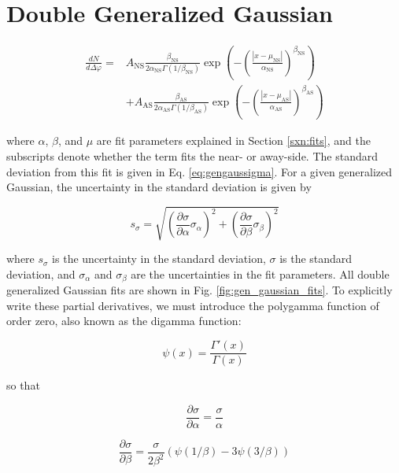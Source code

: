 \documentclass[../main.tex]{subfiles}
\begin{document}
\clearpage
\section{Double Generalized Gaussian}

\begin{align}
     \frac{dN}{d\Delta\varphi} =& A_{\text{NS}}\frac{\beta_{\text{NS}}}{2\alpha_{\text{NS}}\Gamma(1/\beta_{\text{NS}})}\exp{\left(-\left(\frac{|x-\mu_{\text{NS}}|}{\alpha_\text{NS}}\right)^{\beta_{\text{NS}}}\right)} \\
     &+ A_{\text{AS}}\frac{\beta_{\text{AS}}}{2\alpha_{\text{AS}}\Gamma(1/\beta_{\text{AS}})}\exp{\left(-\left(\frac{|x-\mu_{\text{AS}}|}{\alpha_\text{AS}}\right)^{\beta_{\text{AS}}}\right)}
\end{align}

where $\alpha$, $\beta$, and $\mu$ are fit parameters explained in Section \ref{sxn:fits}, and the subscripts denote whether the term fits the near- or away-side. The standard deviation from this fit is given in Eq. \ref{eq:gengaussigma}. For a given generalized Gaussian, the uncertainty in the standard deviation is given by

\begin{equation}
    s_{\sigma} = \sqrt{\left(\frac{\partial \sigma}{\partial \alpha} \sigma_\alpha\right)^2 + \left(\frac{\partial \sigma}{\partial \beta} \sigma_\beta\right)^2}
\end{equation}

where $s_\sigma$ is the uncertainty in the standard deviation, $\sigma$ is the standard deviation, and $\sigma_\alpha$ and $\sigma_\beta$ are the uncertainties in the fit parameters. All double generalized Gaussian fits are shown in Fig. \ref{fig:gen_gaussian_fits}. To explicitly write these partial derivatives, we must introduce the polygamma function of order zero, also known as the digamma function:

\begin{equation}
    \psi(x) = \frac{\Gamma'(x)}{\Gamma(x)}
\end{equation}

so that

\begin{equation}
    \frac{\partial \sigma}{\partial \alpha} = \frac{\sigma}{\alpha}
\end{equation}

\begin{equation}
    \frac{\partial \sigma}{\partial \beta} = \frac{\sigma}{2 \beta^2} (\psi(1/\beta) - 3 \psi(3/\beta))
\end{equation}
\end{document}
